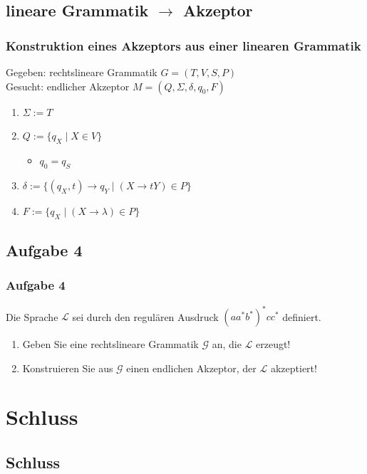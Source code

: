 \subsection{lineare Grammatik $\rightarrow$ Akzeptor}
\begin{frame}
\frametitle{Konstruktion eines Akzeptors aus einer linearen Grammatik}
Gegeben: rechtslineare Grammatik $G = (T, V, S, P)$~\\
Gesucht: endlicher Akzeptor $M = (Q,\Sigma,\delta,q_0,F)$

\begin{enumerate}
	\item $\Sigma:= T$
	\item $Q:= \{q_X \; \vert \; X \in V\}$
		\begin{itemize}
			\item $q_0 = q_S$
		\end{itemize}
	\item $\delta:= \{ (q_X, t) \rightarrow q_Y \; \vert \; (X \rightarrow tY) \in P \} $	
	\item $F:= \{q_X \; \vert \; (X \rightarrow \lambda) \in P \}$
\end{enumerate}\end{frame}

\subsection{Aufgabe 4}
\begin{frame}
	\frametitle{Aufgabe 4}
	Die Sprache $\mathcal{L}$ sei durch den regulären Ausdruck $(aa^*b^*)^*cc^*$
	definiert.
	\begin{enumerate}
		\item Geben Sie eine rechtslineare Grammatik $\mathcal{G}$ an, die $\mathcal{L}$
		erzeugt!
		\item Konstruieren Sie aus $\mathcal{G}$ einen endlichen Akzeptor, der $\mathcal{L}$
	akzeptiert!
	\end{enumerate}
\end{frame}
	
\section{Schluss}
\subsection{Schluss}

